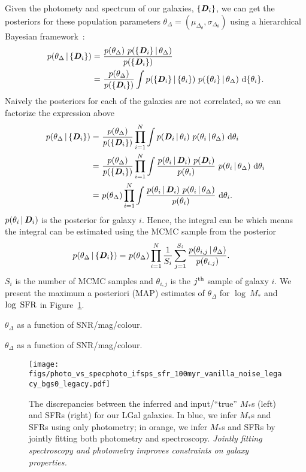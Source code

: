 Given the photomety and spectrum of our galaxies, $\{{\textbf{\textit{D}}}_i\}$, we can get the posteriors
for these population parameters $\theta_\Delta = (\mu_{\Delta_{\theta}}, \sigma_{\Delta_{\theta}})$ 
using a hierarchical Bayesian framework~\citep{hogg2010a}: 
\begin{align}
p(\theta_\Delta \,|\, \{{\textbf{\textit{D}}_i}\}) 
    =&~\frac{p(\theta_\Delta)~p( \{{\textbf{\textit{D}}_i}\} \,|\, \theta_{\Delta})}{p(\{{\textbf{\textit{D}}_i}\})}\\
    =&~\frac{p(\theta_\Delta)}{p(\{{\textbf{\textit{D}}_i}\})}\int p(\{{\textbf{\textit{D}}_i}\} \,|\, \{\theta_i\})~p(\{\theta_i\} \,|\, \theta_\Delta)~{\rm d}\{\theta_i\}.
\end{align} 
Naively the posteriors for each of the galaxies are not correlated, so we can factorize the expression above
\begin{align}
p(\theta_\Delta \,|\, \{{\textbf{\textit{D}}_i}\}) 
    =&~\frac{p(\theta_\Delta)}{p(\{{\textbf{\textit{D}}_i}\})}\prod\limits_{i=1}^N\int p({\textbf{\textit{D}}_i} \,|\, \theta_i)~p(\theta_i \,|\, \theta_\Delta)~{\rm d}\theta_i\\
    =&~\frac{p(\theta_\Delta)}{p(\{{\textbf{\textit{D}}_i}\})}\prod\limits_{i=1}^N\int \frac{p(\theta_i \,|\, {\textbf{\textit{D}}_i})~p({\textbf{\textit{D}}_i})}{p(\theta_i)}~p(\theta_i \,|\, \theta_\Delta)~{\rm d}\theta_i\\
    =&~p(\theta_\Delta)\prod\limits_{i=1}^N\int \frac{p(\theta_i \,|\, {\textbf{\textit{D}}_i})~p(\theta_i \,|\, \theta_\Delta)}{p(\theta_i)}~{\rm d}\theta_i.
\end{align} 
$p(\theta_i \,|\, {\textbf{\textit{D}}_i})$ is the posterior for galaxy $i$. Hence, the
integral can be which means the integral can be estimated using the MCMC sample
from the posterior
\begin{align}
p(\theta_\Delta \,|\, \{{\textbf{\textit{D}}_i}\}) 
    =&~p(\theta_\Delta)\prod\limits_{i=1}^N\frac{1}{S_i}\sum\limits_{j=1}^{S_i}
    \frac{p(\theta_{i,j} \,|\, \theta_\Delta)}{p(\theta_{i,j})}.
\end{align} 
$S_i$ is the number of MCMC samples and $\theta_{i,j}$ is the $j^{\rm th}$
sample of galaxy $i$. We present the maximum a posteriori (MAP) estimates of
$\theta_\Delta$ for $\log~M_*$ and $\log~{\rm SFR}$ in
Figure~\ref{fig:specphoto}. 


$\theta_\Delta$ as a function of SNR/mag/colour. 

$\theta_\Delta$ as a function of SNR/mag/colour. 

\begin{figure}
\begin{center}
\texttt{[image: figs/photo\_vs\_specphoto\_ifsps\_sfr\_100myr\_vanilla\_noise\_legacy\_bgs0\_legacy.pdf]} 
\caption{The discrepancies between the inferred and input/``true'' $M_*$s (left) and SFRs 
(right) for our {\sc LGal} galaxies. In blue, we infer $M_*$s and SFRs using only photometry;
in orange, we infer $M_*$s and SFRs by jointly fitting both photometry and spectroscopy. 
{\em Jointly fitting spectroscopy and photometry improves constraints on galaxy properties.}
}
\label{fig:specphoto}
\end{center}
\end{figure}

